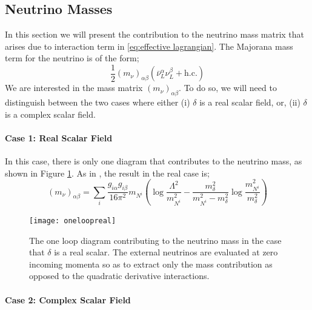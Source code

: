 \subsection{Neutrino Masses}\label{sec:neutrinomass}

In this section we will present the contribution to the neutrino mass matrix that arises due to interaction term in \eqref{eq:effective lagrangian}. The Majorana mass term for the neutrino is of the form;
\begin{equation}\label{eq:neutrino mass}
  \frac{1}{2}(m_\nu)_{\alpha\beta}\left(\bar{\nu}^\alpha_L \nu^\beta_L + \text{h.c.}\right)
\end{equation}
We are interested in the mass matrix $(m_\nu)_{\alpha\beta}$. To do so, we will need to distinguish between the two cases where either (i) $\delta$ is a real scalar field, or, (ii) $\delta$ is a complex scalar field.
\paragraph{Case 1: Real Scalar Field}
In this case, there is only one diagram that contributes to the neutrino mass, as shown in Figure \ref{fig:onelooprealdiag}. As in \cite{Farzan2010, Boehm2006, Farzan2011}, the result in the real case is;
\begin{equation}\label{eq:oneloopmass result}
  (m_\nu)_{\alpha\beta} = \sum_{i}{\frac{g_{i\alpha}g_{i\beta}}{16\pi^2}m_{N^i}\left(\log\frac{\Lambda^2}{m_{N^i}^2} - \frac{m_\delta^2}{m_{N^i}^2 - m_\delta^2}\log\frac{m_{N^i}^2}{m_\delta^2}\right)}
\end{equation}
\begin{figure}
  \centering
  \texttt{[image: oneloopreal]}
  \caption{The one loop diagram contributing to the neutrino mass in the case that $\delta$ is a real scalar. The external neutrinos are evaluated at zero incoming momenta so as to extract only the mass contribution as opposed to the quadratic derivative interactions.}
  \label{fig:onelooprealdiag}
\end{figure}

\paragraph{Case 2: Complex Scalar Field}



